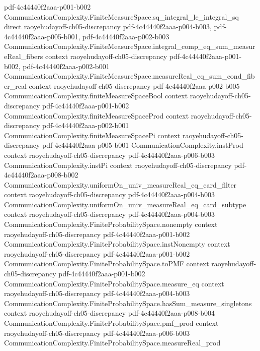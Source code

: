 \begin{lemma}
  {pdf-4c44440f2aaa-p001-b002}
\proofstep
  {CommunicationComplexity.FiniteMeasureSpace.sq_integral_le_integral_sq}
  {direct}
  {raoyehudayoff-ch05-discrepancy}
  {pdf-4c44440f2aaa-p004-b003,
    pdf-4c44440f2aaa-p005-b001,
    pdf-4c44440f2aaa-p002-b003}
\proofstep
  {CommunicationComplexity.FiniteMeasureSpace.integral_comp_eq_sum_measureReal_fibers}
  {context}
  {raoyehudayoff-ch05-discrepancy}
  {pdf-4c44440f2aaa-p001-b002,
    pdf-4c44440f2aaa-p002-b001}
\proofstep
  {CommunicationComplexity.FiniteMeasureSpace.measureReal_eq_sum_cond_fiber_real}
  {context}
  {raoyehudayoff-ch05-discrepancy}
  {pdf-4c44440f2aaa-p002-b005}
\proofstep
  {CommunicationComplexity.finiteMeasureSpaceBool}
  {context}
  {raoyehudayoff-ch05-discrepancy}
  {pdf-4c44440f2aaa-p001-b002}
\proofstep
  {CommunicationComplexity.finiteMeasureSpaceProd}
  {context}
  {raoyehudayoff-ch05-discrepancy}
  {pdf-4c44440f2aaa-p002-b001}
\proofstep
  {CommunicationComplexity.finiteMeasureSpacePi}
  {context}
  {raoyehudayoff-ch05-discrepancy}
  {pdf-4c44440f2aaa-p005-b001}
\proofstep
  {CommunicationComplexity.instProd}
  {context}
  {raoyehudayoff-ch05-discrepancy}
  {pdf-4c44440f2aaa-p006-b003}
\proofstep
  {CommunicationComplexity.instPi}
  {context}
  {raoyehudayoff-ch05-discrepancy}
  {pdf-4c44440f2aaa-p008-b002}
\proofstep
  {CommunicationComplexity.uniformOn_univ_measureReal_eq_card_filter}
  {context}
  {raoyehudayoff-ch05-discrepancy}
  {pdf-4c44440f2aaa-p004-b003}
\proofstep
  {CommunicationComplexity.uniformOn_univ_measureReal_eq_card_subtype}
  {context}
  {raoyehudayoff-ch05-discrepancy}
  {pdf-4c44440f2aaa-p004-b003}
\proofstep
  {CommunicationComplexity.FiniteProbabilitySpace.nonempty}
  {context}
  {raoyehudayoff-ch05-discrepancy}
  {pdf-4c44440f2aaa-p001-b002}
\proofstep
  {CommunicationComplexity.FiniteProbabilitySpace.instNonempty}
  {context}
  {raoyehudayoff-ch05-discrepancy}
  {pdf-4c44440f2aaa-p001-b002}
\proofstep
  {CommunicationComplexity.FiniteProbabilitySpace.toPMF}
  {context}
  {raoyehudayoff-ch05-discrepancy}
  {pdf-4c44440f2aaa-p001-b002}
\proofstep
  {CommunicationComplexity.FiniteProbabilitySpace.measure_eq}
  {context}
  {raoyehudayoff-ch05-discrepancy}
  {pdf-4c44440f2aaa-p004-b003}
\proofstep
  {CommunicationComplexity.FiniteProbabilitySpace.hasSum_measure_singletons}
  {context}
  {raoyehudayoff-ch05-discrepancy}
  {pdf-4c44440f2aaa-p008-b004}
\proofstep
  {CommunicationComplexity.FiniteProbabilitySpace.pmf_prod}
  {context}
  {raoyehudayoff-ch05-discrepancy}
  {pdf-4c44440f2aaa-p006-b003}
\proofstep
  {CommunicationComplexity.FiniteProbabilitySpace.measureReal_prod}

\end{lemma}
